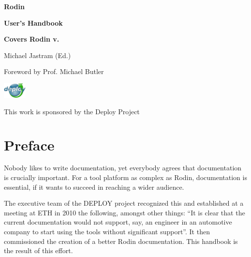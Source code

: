 \documentclass[12pt]{book}
\begin{document}
\begin{titlepage}
\AddToShipoutPicture*{\BackgroundPic}
\vspace*{14.5cm}
{\fontsize{70}{85}\selectfont \bfseries Rodin}

\vspace*{0.2cm}
{\fontsize{24.5}{30}\selectfont \bfseries User's Handbook}

\vspace*{1cm}
{\fontsize{16}{19}\selectfont \textbf{\textsf{Covers Rodin v.\versionnr}}}

\vspace*{1cm}
{\fontsize{16}{19}\selectfont \textsf{Michael Jastram (Ed.)}}

\vspace*{0.2cm}
{\fontsize{16}{19}\selectfont \textsf{Foreword by Prof. Michael Butler}}

\vspace*{1cm}
\includegraphics[width=12mm]{img/deploy-logo.png}

\vspace*{-8.4mm}
\hspace*{12mm}
{ \fontsize{11}{15}\selectfont \textsf{This work is sponsored by the Deploy Project}}

\vspace*{-22mm}

\end{titlepage}
{}
\tableofcontents
\fi

\chapter*{Preface}
\label{preface}

Nobody likes to write documentation, yet everybody agrees that documentation is crucially important.  For a tool platform as complex as Rodin, documentation is essential, if it wants to succeed in reaching a wider audience.

The executive team of the DEPLOY project recognized this and established at a meeting at ETH in 2010 the following, amongst other things: ``It is clear that the current documentation would not support, say, an engineer in an automotive company to start using the tools without significant support''.  It then commissioned the creation of a better Rodin documentation.  This handbook is the result of this effort.
\end{document}
